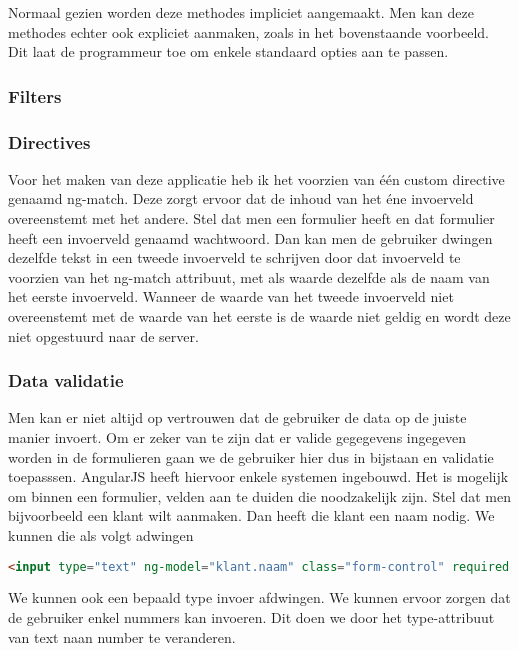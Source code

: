 \documentclass[a4paper,11pt]{article}
\begin{document}
Normaal gezien worden deze methodes impliciet aangemaakt. Men kan deze methodes echter ook expliciet aanmaken, zoals in het bovenstaande voorbeeld. Dit laat de programmeur toe om enkele standaard opties aan te passen.

\subsubsection{Filters}

\subsubsection{Directives}
Voor het maken van deze applicatie heb ik het voorzien van één custom directive genaamd ng-match. Deze zorgt ervoor dat de inhoud van het éne invoerveld overeenstemt met het andere. Stel dat men een formulier heeft en dat formulier heeft een invoerveld genaamd wachtwoord. Dan kan men de gebruiker dwingen dezelfde tekst in een tweede invoerveld te schrijven door dat invoerveld te voorzien van het ng-match attribuut, met als waarde dezelfde als de naam van het eerste invoerveld. Wanneer de waarde van het tweede invoerveld niet overeenstemt met de waarde van het eerste is de waarde niet geldig en wordt deze niet opgestuurd naar de server.

\subsubsection{Data validatie}
Men kan er niet altijd op vertrouwen dat de gebruiker de data op de juiste manier invoert. Om er zeker van te zijn dat er valide gegegevens ingegeven worden in de formulieren gaan we de gebruiker hier dus in bijstaan en validatie toepasssen. AngularJS heeft hiervoor enkele systemen ingebouwd. Het is mogelijk om binnen een formulier, velden aan te duiden die noodzakelijk zijn. Stel dat men bijvoorbeeld een klant wilt aanmaken. Dan heeft die klant een naam nodig. We kunnen die als volgt adwingen
\begin{lstlisting}[language=html]
<input type="text" ng-model="klant.naam" class="form-control" required />
\end{lstlisting}

We kunnen ook een bepaald type invoer afdwingen. We kunnen ervoor zorgen dat de gebruiker enkel nummers kan invoeren. Dit doen we door het type-attribuut van text naan number te veranderen.
\end{document}
